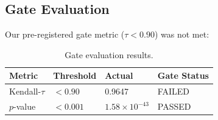 \subsection{Gate Evaluation}

Our pre-registered gate metric ($\tau < 0.90$) was not met:

\begin{table}[h]
\centering
\caption{Gate evaluation results.}
\label{tab:gate}
\begin{tabular}{@{}llll@{}}
\toprule
\textbf{Metric} & \textbf{Threshold} & \textbf{Actual} & \textbf{Gate Status} \\
\midrule
Kendall-$\tau$ & $< 0.90$ & 0.9647 & FAILED \\
$p$-value & $< 0.001$ & $1.58 \times 10^{-43}$ & PASSED \\
\bottomrule
\end{tabular}
\end{table}
